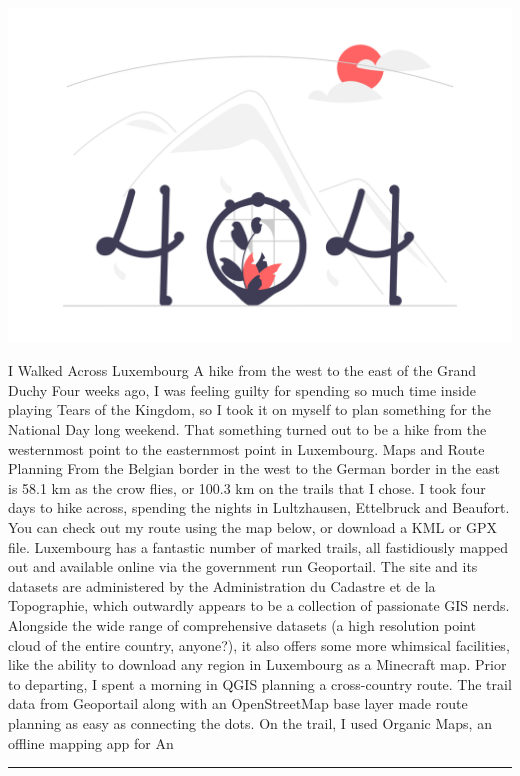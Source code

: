 \documentclass[10pt,a4paper]{article}
\begin{document}
\begin{minipage}[t]{0.80\linewidth}
\vspace{0pt}
\begin{multicols}{2}

    \href{https://blog.ioces.com/matt/posts/i-walked-across-luxembourg/?utm\_source=hackernewsletter\&utm\_medium=email\&utm\_term=fav}{
        \includegraphics[width=0.99\linewidth]{notfound.png}
    }
  
I Walked Across Luxembourg
A hike from the west to the east of the Grand Duchy
Four weeks ago, I was feeling guilty for spending so much time inside playing Tears of the Kingdom, so I took it on myself to plan something for the National Day long weekend. That something turned out to be a hike from the westernmost point to the easternmost point in Luxembourg.
Maps and Route Planning
From the Belgian border in the west to the German border in the east is 58.1 km as the crow flies, or 100.3 km on the trails that I chose. I took four days to hike across, spending the nights in Lultzhausen, Ettelbruck and Beaufort. You can check out my route using the map below, or download a KML or GPX file.
Luxembourg has a fantastic number of marked trails, all fastidiously mapped out and available online via the government run Geoportail. The site and its datasets are administered by the Administration du Cadastre et de la Topographie, which outwardly appears to be a collection of passionate GIS nerds. Alongside the wide range of comprehensive datasets (a high resolution point cloud of the entire country, anyone?), it also offers some more whimsical facilities, like the ability to download any region in Luxembourg as a Minecraft map.
Prior to departing, I spent a morning in QGIS planning a cross-country route. The trail data from Geoportail along with an OpenStreetMap base layer made route planning as easy as connecting the dots. On the trail, I used Organic Maps, an offline mapping app for An

\end{multicols}
\end{minipage}
\par\medskip
\noindent\textcolor{red}{\rule{\linewidth}{0.2mm}}
\end{document}
